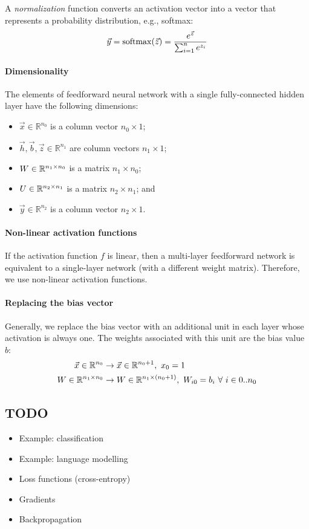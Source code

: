 A \textit{normalization} function converts an activation vector into a vector
that represents a probability distribution, e.g., softmax:
\begin{equation}
  \vec{y} = \operatorname{softmax}(\vec{z}) = \frac{e^{\vec{z}}}{\sum_{i = 1}^{n} e^{z_i}}
\end{equation}

\paragraph{Dimensionality}

The elements of feedforward neural network with a single fully-connected hidden
layer have the following dimensions:
\begin{itemize}
  \item $\vec{x} \in \mathbb{R}^{n_0}$ is a column vector $n_0 \times 1$;
  \item $\vec{h}, \vec{b}, \vec{z} \in \mathbb{R}^{n_1}$ are column vectors $n_1 \times 1$;
  \item $W \in \mathbb{R}^{n_1 \times n_0}$ is a matrix $n_1 \times n_0$;
  \item $U \in \mathbb{R}^{n_2 \times n_1}$ is a matrix $n_2 \times n_1$; and
  \item $\vec{y} \in \mathbb{R}^{n_2}$ is a column vector $n_2 \times 1$.
\end{itemize}

\paragraph{Non-linear activation functions}

If the activation function $f$ is linear, then a multi-layer feedforward network
is equivalent to a single-layer network (with a different weight matrix).
Therefore, we use non-linear activation functions.

\paragraph{Replacing the bias vector}

Generally, we replace the bias vector with an additional unit in each layer
whose activation is always one.
The weights associated with this unit are the bias value $b$:
\begin{align*}
  \vec{x} \in \mathbb{R}^{n_0}
   & \rightarrow \vec{x} \in \mathbb{R}^{n_0 + 1},\
  x_0 = 1                                                         \\
  W \in \mathbb{R}^{n_1 \times n_0}
   & \rightarrow W \in \mathbb{R}^{n_1 \times (n_0 + 1)},\
  W_{i0} = b_i \ \forall\ i \in 0 .. n_0                          \\
\end{align*}

\subsection{TODO}

\begin{itemize}
  \item Example: classification
  \item Example: language modelling
  \item Loss functions (cross-entropy)
  \item Gradients
  \item Backpropagation
\end{itemize}